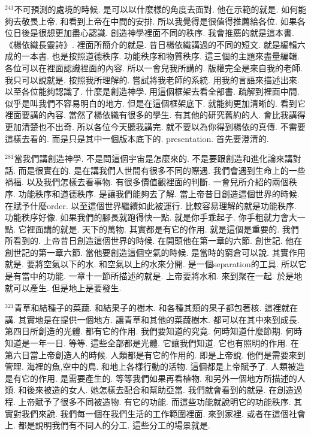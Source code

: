 \documentclass{book}
\begin{document}
$^{241}$不可預測的處境的時候.
是可以以什麼樣的角度去面對.
他在示範的就是.
如何能夠去敬畏上帝.
和看到上帝在中間的安排.
所以我覺得是很值得推薦給各位.
如果各位日後是很想更加盡心認識.
創造神學裡面不同的秩序.
我會推薦的就是這本書.
《楊依織長靈詩》.
裡面所簡介的就是.
昔日楊依織講過的不同的短文.
就是編輯六成的一本書.
也是按照道德秩序.
功能秩序和物質秩序.
這三個的主題來盡量編輯.
各位可以在裡面認識裡面的內容.
所以一會兒我所講的.
版權完全是來自我的老師.
我只可以說就是.
按照我所理解的.
嘗試將我老師的系統.
用我的言語來描述出來.
以至各位能夠認識了.
什麼是創造神學.
用這個框架去看全部書.
疏解到裡面中間.
似乎是叫我們不容易明白的地方.
但是在這個框架底下.
就能夠更加清晰的.
看到它裡面要講的內容.
當然了楊依織有很多的學生.
有其他的研究舊約的人.
會比我講得更加清楚也不出奇.
所以各位今天聽我講完.
就不要以為你得到楊依的真傳.
不需要這樣去看的.
而是只是其中一個版本底下的.
presentation.
首先要澄清的.

$^{281}$當我們講創造神學.
不是問這個宇宙是怎麼來的.
不是要跟創造和進化論來講對話.
而是很實在的.
是在講我們人世間有很多不同的際遇.
我們會遇到生命上的一些禍福.
以及我們怎樣去看事物.
有很多價值觀裡面的判斷.
一會兒所介紹的兩個秩序.
功能秩序和道德秩序.
是讓我們能夠去了解.
當上帝昔日創造這個世界的時候.
在賦予什麼order.
以至這個世界繼續如此被運行.
比較容易理解的就是功能秩序.
功能秩序好像.
如果我們的腳長就跑得快一點.
就是你手乖起子.
你手粗就力會大一點.
它裡面講的就是.
天下的萬物.
其實都是有它的作用.
就是這個是重要的.
我們所看到的.
上帝昔日創造這個世界的時候.
在開頭他在第一章的六節.
創世記.
他在創世記的第一章六節.
當他要創造這個空氣的時候.
是當時的窮倉可以說.
其實作用就是.
要將空氣以下的水.
和空氣以上的水來分開.
是一個separation的工具.
所以它是有當中的功能.
一章十一節所描述的就是.
上帝要將水和.
來到聚在一起.
於是地就可以產生.
但是地上是要發生.

$^{321}$青草和結種子的菜蔬.
和結果子的樹木.
和各種其類的果子都包著核.
這裡就在講.
其實地是在提供一個地方.
讓青草和其他的菜蔬樹木.
都可以在其中來到成長.
第四日所創造的光體.
都有它的作用.
我們要知道的究竟.
何時知道什麼節期.
何時知道是一年一日.
等等.
這些全部都是光體.
它讓我們知道.
它也有照明的作用.
在第六日當上帝創造人的時候.
人類都是有它的作用的.
即是上帝說.
他們是需要來到管理.
海裡的魚,空中的鳥.
和地上各樣行動的活物.
這個都是上帝賦予了.
人類被造是有它的作用.
是需要產生的.
等等我們如果再看植物.
和另外一個地方所描述的人類.
和後來被造的女人.
她怎樣去配合和幫助亞當.
我們就會看到的就是.
在創造過程.
上帝賦予了很多不同被造物.
有它的功能.
而這些功能就說明它的功能秩序.
其實對我們來說.
我們每一個在我們生活的工作範圍裡面.
來到家裡.
或者在這個社會上.
都是說明我們有不同人的分工.
這些分工的場景就是.
\end{document}
